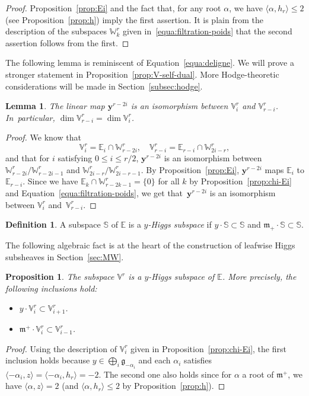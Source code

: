 \documentclass[10pt]{amsart}
\theoremstyle{plain}
\newtheorem{lemm}[theo]{Lemma}
\newtheorem{prop}[theo]{Proposition}
\theoremstyle{definition}
\newtheorem{defi}[theo]{Definition}
\let\rgy r
\newcommand{\bE}{\mathbb{E}}
\newcommand{\bS}{\mathbb{S}}
\newcommand{\Vr}{\mathbb{V}^\rgy}
\newcommand{\Wr}{\mathbb{W}^\rgy}
\newcommand{\by}{\boldsymbol{y}}
\newcommand{\fgg}{\mathfrak{g}}
\newcommand{\fm}{\mathfrak{m}}
\newcommand{\scal}[1]{\langle #1 \rangle}
\begin{document}
\begin{proof}
Proposition~\ref{prop:Ei} and the fact that, for any root $\alpha$,
we have $\scal{\alpha, h_\rgy} \leq 2$ (see Proposition~\ref{prop:h}) imply the first assertion. It is plain from the description of the subspaces $\Wr_k$ given in~\eqref{equa:filtration-poids}
that the second assertion follows from the first.
\end{proof}

The following lemma is reminiscent of
Equation~\eqref{equa:deligne}. We will prove a stronger statement in
Proposition~\ref{prop:V-self-dual}. More Hodge-theoretic considerations will be made in
Section~\ref{subsec:hodge}.

\begin{lemm}
\label{lemm:dim-Vi}
The linear map $\by^{\rgy-2i}$ is an isomorphism between $\Vr_i$ and $\Vr_{\rgy-i}$. In~particular,
$\dim \Vr_{\rgy-i} = \dim \Vr_i$.
\end{lemm}

\begin{proof}
We know that $$\Vr_i=\bE_i\cap\Wr_{\rgy-2i},\quad
\Vr_{\rgy-i}=\bE_{\rgy-i}\cap\Wr_{2i-\rgy},$$ and that for $i$ satisfying \hbox{$0\leq i\leq \rgy/2$}, $\by^{\rgy-2i}$ is
an isomorphism between
$\Wr_{\rgy-2i}/\Wr_{\rgy-2i-1}$ and $\Wr_{2i-\rgy}/\Wr_{2i-\rgy-1}$. By Proposition~\ref{prop:Ei},
$\by^{\rgy-2i}$ maps $\bE_i$ to $\bE_{\rgy-i}$. Since we have \hbox{$\bE_k\!\cap\!\Wr_{\rgy-2k-1}\!=\!\{0\}$} for all $k$ by
Proposition~\ref{prop:chi-Ei} and Equation~\eqref{equa:filtration-poids}, we get that~$\by^{\rgy-2i}$ is an isomorphism between $\Vr_i$ and~$\Vr_{\rgy-i}$.
\end{proof}

\begin{defi}
\label{def:yHiggs}
A subspace $\bS$ of $\bE$ is a \emph{$y$-Higgs subspace} if $y\cdot\bS\subset\bS$ and
$\fm_+\cdot\bS\subset\bS$.
\end{defi}

The following algebraic fact is at the heart of the construction of leafwise Higgs subsheaves
in Section~\ref{sec:MW}.

\begin{prop}
\label{prop:algHiggs}
The subspace $\Vr$ is a $y$-Higgs subspace of $\bE$. More precisely, the following inclusions hold:
\begin{itemize}
\item $y \cdot \Vr_i \subset \Vr_{i+1}$.
\item $\fm^+ \cdot \Vr_i \subset \Vr_{i-1}$.
\end{itemize}
\end{prop}
\begin{proof}
Using the description of $\Vr_i$ given in Proposition~\ref{prop:chi-Ei}, the first inclusion
holds because $y \in \bigoplus_{i} \fgg_{-\alpha_i}$ and each $\alpha_i$ satisfies
$\scal{-\alpha_i,z}=\scal{-\alpha_i,h_\rgy}=-2$. The second one also holds since for $\alpha$ a root of
$\fm^+$, we have $\scal{\alpha,z}=2$ (and $\scal{\alpha,h_\rgy} \leq 2$ by Proposition~\ref{prop:h}).
\end{proof}
\end{document}
